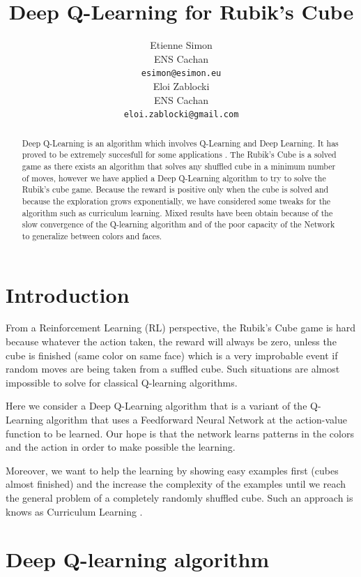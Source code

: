 \documentclass{article} %
\title{Deep Q-Learning for Rubik's Cube}
\author{
Etienne Simon\\
ENS Cachan\\
\texttt{esimon@esimon.eu} \\
\And
Eloi Zablocki \\
ENS Cachan \\
\texttt{eloi.zablocki@gmail.com} \\
}
\begin{document}
\maketitle

\begin{abstract}
Deep Q-Learning is an algorithm which involves Q-Learning and Deep Learning. It has proved to be extremely succesfull for some applications \cite{deepmind}. The Rubik's Cube is a solved game as there exists an algorithm that solves any shuffled cube in a minimum number of moves, however we have applied a Deep Q-Learning algorithm to try to solve the Rubik's cube game. Because the reward is positive only when the cube is solved and because the exploration grows exponentially, we have considered some tweaks for the algorithm such as curriculum learning. Mixed results have been obtain because of the slow convergence of the Q-learning algorithm and of the poor capacity of the Network to generalize between colors and faces.

\end{abstract}

\section{Introduction}
From a Reinforcement Learning (RL) perspective, the Rubik's Cube game is hard because whatever the action taken, the reward will always be zero, unless the cube is finished (same color on same face) which is a very improbable event if random moves are being taken from a suffled cube. Such situations are almost impossible to solve for classical Q-learning algorithms.

Here we consider a Deep Q-Learning algorithm that is a variant of the Q-Learning algorithm that uses a Feedforward Neural Network at the action-value function to be learned. Our hope is that the network learns patterns in the colors and the action in order to make possible the learning.

Moreover, we want to help the learning by showing easy examples first (cubes almost finished) and the increase the complexity of the examples until we reach the general problem of a completely randomly shuffled cube. Such an approach is knows as Curriculum Learning \cite{curriculum}.


\section{Deep Q-learning algorithm}
\end{document}
